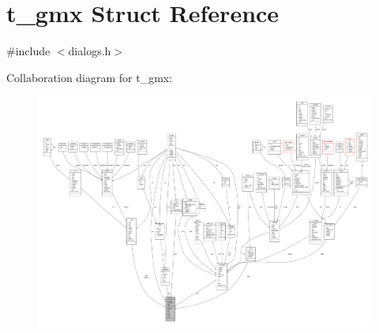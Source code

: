 \hypertarget{structt__gmx}{\section{t\-\_\-gmx \-Struct \-Reference}
\label{structt__gmx}
}


{\ttfamily \#include $<$dialogs.\-h$>$}



\-Collaboration diagram for t\-\_\-gmx\-:
\nopagebreak
\begin{figure}[H]
\begin{center}
\leavevmode
\includegraphics[width=350pt]{structt__gmx__coll__graph}
\end{center}
\end{figure}
